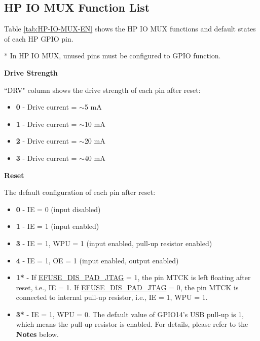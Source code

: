 \documentclass[main\_\_EN.tex]{subfiles}
\begin{document}
\begin{landscape}

\tableheaderHPSignalEN
\tablecontentHPSignal


\section{HP IO MUX Function List}
\label{sec:hp_iomux_pads}
Table \ref{tab:HP-IO-MUX-EN} shows the HP IO MUX functions and default states of each HP GPIO pin.


\tableheaderHPFunctionsEN
\tablecontentHPFunctions

* In HP IO MUX, unused pins must be configured to GPIO function.

\end{landscape}

\textbf{Drive Strength}

``DRV" column shows the drive strength of each pin after reset:

\begin{itemize}
\item \textbf{0} - Drive current = $\sim$5 mA
\item \textbf{1} - Drive current = $\sim$10 mA
\item \textbf{2} - Drive current = $\sim$20 mA
\item \textbf{3} - Drive current = $\sim$40 mA
\end{itemize}

    \textbf{Reset}

    The default configuration of each pin after reset:

\begin{itemize}
\item \textbf{0} - IE = 0 (input disabled)
\item \textbf{1} - IE = 1 (input enabled)
\item \textbf{3} - IE = 1, WPU = 1 (input enabled, pull-up resistor enabled)
\item \textbf{4} - IE = 1, OE = 1 (input enabled, output enabled)
\item \textbf{1*} - If \hyperref[fielddesc:EFUSEDISPADJTAG]{EFUSE\_DIS\_PAD\_JTAG} = 1, the pin MTCK is left floating after reset, i.e., IE = 1. If \hyperref[fielddesc:EFUSEDISPADJTAG]{EFUSE\_DIS\_PAD\_JTAG} = 0, the pin MTCK is connected to internal pull-up resistor, i.e., IE = 1, WPU = 1.
\item \textbf{3*} - IE = 1, WPU = 0. The default value of GPIO14's USB pull-up is 1, which means the pull-up resistor is enabled. For details, please refer to the \textbf{Notes} below.
\end{itemize}
\end{document}

